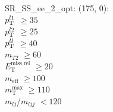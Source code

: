 SR\_SS\_ee\_2\_opt: (175, 0): \\
$p_{\text{T}}^{l1}$ $\geq 35$ \\
$p_{\text{T}}^{l2}$ $\geq 25$ \\
$p_{\text{T}}^{ll}$ $\geq 40$ \\
$m_{T2}$ $\geq 60$ \\
$E_{\text{T}}^{\text{miss,rel}}$ $\geq 20$ \\
$m_{\text{eff}}$ $\geq 100$ \\
$m_{\text{T}}^{\text{max}}$ $\geq 110$ \\
$m_{lj}$/$m_{ljj}$ $<120$ \\
